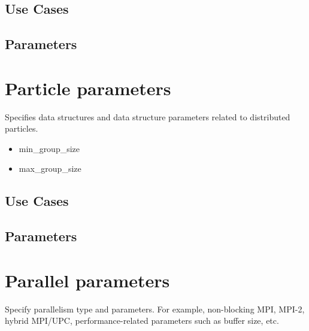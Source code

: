 \documentclass{book}
\begin{document}
\subsection{Use Cases}
\subsection{Parameters}

\section{Particle parameters} \label{s:data}

Specifies data structures and data structure parameters related
to distributed particles.  

\begin{itemize}
\item min\_group\_size
\item max\_group\_size
\end{itemize}

\subsection{Use Cases}
\subsection{Parameters}

\section{Parallel parameters} \label{s:parallel}

Specify parallelism type and parameters.  For example, non-blocking
MPI, MPI-2, hybrid MPI/UPC, performance-related parameters such as
buffer size, etc.
\end{document}
